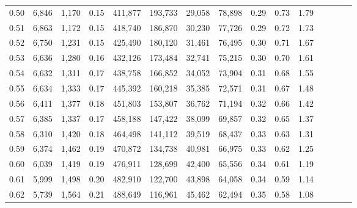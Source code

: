 \begin{tabular}{rrrcrrrrrrrrrrr}
0.50 &   6,846 &  1,170 &                                       0.15 &  411,877 &  193,733 &   29,058 &   78,898 &  0.29 &  0.73 &                         1.79 \\
0.51 &   6,863 &  1,172 &                                       0.15 &  418,740 &  186,870 &   30,230 &   77,726 &  0.29 &  0.72 &                         1.73 \\
0.52 &   6,750 &  1,231 &                                       0.15 &  425,490 &  180,120 &   31,461 &   76,495 &  0.30 &  0.71 &                         1.67 \\
0.53 &   6,636 &  1,280 &                                       0.16 &  432,126 &  173,484 &   32,741 &   75,215 &  0.30 &  0.70 &                         1.61 \\
0.54 &   6,632 &  1,311 &                                       0.17 &  438,758 &  166,852 &   34,052 &   73,904 &  0.31 &  0.68 &                         1.55 \\
0.55 &   6,634 &  1,333 &                                       0.17 &  445,392 &  160,218 &   35,385 &   72,571 &  0.31 &  0.67 &                         1.48 \\
0.56 &   6,411 &  1,377 &                                       0.18 &  451,803 &  153,807 &   36,762 &   71,194 &  0.32 &  0.66 &                         1.42 \\
0.57 &   6,385 &  1,337 &                                       0.17 &  458,188 &  147,422 &   38,099 &   69,857 &  0.32 &  0.65 &                         1.37 \\
0.58 &   6,310 &  1,420 &                                       0.18 &  464,498 &  141,112 &   39,519 &   68,437 &  0.33 &  0.63 &                         1.31 \\
0.59 &   6,374 &  1,462 &                                       0.19 &  470,872 &  134,738 &   40,981 &   66,975 &  0.33 &  0.62 &                         1.25 \\
0.60 &   6,039 &  1,419 &                                       0.19 &  476,911 &  128,699 &   42,400 &   65,556 &  0.34 &  0.61 &                         1.19 \\
0.61 &   5,999 &  1,498 &                                       0.20 &  482,910 &  122,700 &   43,898 &   64,058 &  0.34 &  0.59 &                         1.14 \\
0.62 &   5,739 &  1,564 &                                       0.21 &  488,649 &  116,961 &   45,462 &   62,494 &  0.35 &  0.58 &                         1.08 \\

\end{tabular}
